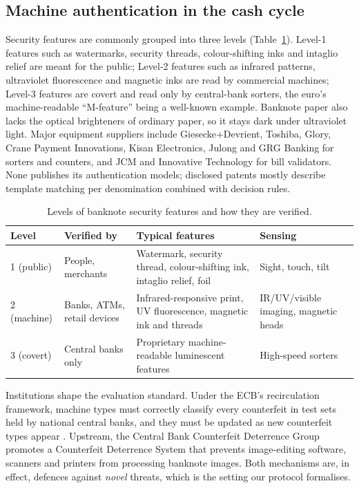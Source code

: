 \documentclass{article}
\theoremstyle{definition}
\theoremstyle{remark}
\begin{document}
\subsection{Machine authentication in the cash cycle}

Security features are commonly grouped into three levels (Table~\ref{tab:levels}). Level-1 features such as watermarks, security threads, colour-shifting inks and intaglio relief are meant for the public; Level-2 features such as infrared patterns, ultraviolet fluorescence and magnetic inks are read by commercial machines; Level-3 features are covert and read only by central-bank sorters, the euro's machine-readable ``M-feature'' being a well-known example. Banknote paper also lacks the optical brighteners of ordinary paper, so it stays dark under ultraviolet light. Major equipment suppliers include Giesecke+Devrient, Toshiba, Glory, Crane Payment Innovations, Kisan Electronics, Julong and GRG Banking for sorters and counters, and JCM and Innovative Technology for bill validators. None publishes its authentication models; disclosed patents mostly describe template matching per denomination combined with decision rules.

\begin{table}[t]
\centering
\small
\caption{Levels of banknote security features and how they are verified.}
\label{tab:levels}
\begin{tabularx}{\textwidth}{@{}l l X l@{}}
\toprule
Level & Verified by & Typical features & Sensing \\
\midrule
1 (public) & People, merchants & Watermark, security thread, colour-shifting ink, intaglio relief, foil & Sight, touch, tilt \\
2 (machine) & Banks, ATMs, retail devices & Infrared-responsive print, UV fluorescence, magnetic ink and threads & IR/UV/visible imaging, magnetic heads \\
3 (covert) & Central banks only & Proprietary machine-readable luminescent features & High-speed sorters \\
\bottomrule
\end{tabularx}
\end{table}

Institutions shape the evaluation standard. Under the ECB's recirculation framework, machine types must correctly classify every counterfeit in test sets held by national central banks, and they must be updated as new counterfeit types appear \citep{ecb2010decision}. Upstream, the Central Bank Counterfeit Deterrence Group promotes a Counterfeit Deterrence System that prevents image-editing software, scanners and printers from processing banknote images. Both mechanisms are, in effect, defences against \emph{novel} threats, which is the setting our protocol formalises.
\end{document}
